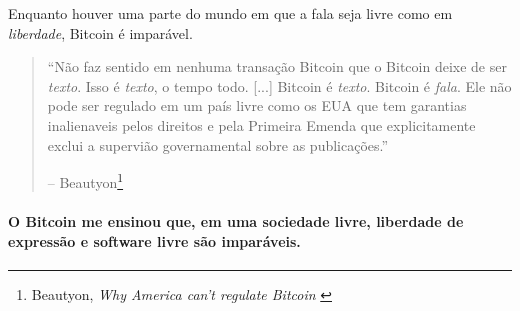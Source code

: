 Enquanto houver uma parte do mundo em que a fala seja livre como em
\textit{liberdade}, Bitcoin é imparável.

\begin{quotation}\begin{samepage}
\enquote{Não faz sentido em nenhuma transação Bitcoin que o Bitcoin deixe de ser
\textit{texto}. Isso é \textit{texto}, o tempo todo. [...] Bitcoin é	
\textit{texto}. Bitcoin é \textit{fala}. Ele não pode ser regulado em um país
livre como os EUA que tem garantias inalienaveis pelos direitos e pela Primeira Emenda
que explicitamente exclui a supervião governamental sobre as publicações.}
\begin{flushright} -- Beautyon\footnote{Beautyon, \textit{Why America can't regulate
Bitcoin} \cite{america-regulate-bitcoin}}
\end{flushright}\end{samepage}\end{quotation}

\paragraph{O Bitcoin me ensinou que, em uma sociedade livre, liberdade de expressão e software livre
são imparáveis.}

%
%
%
%
%
%
%
